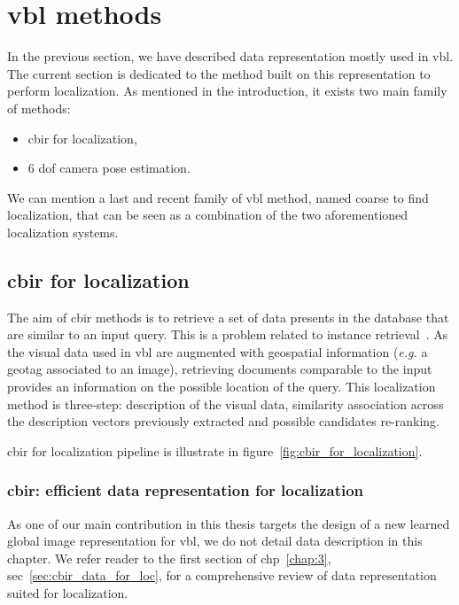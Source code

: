 \section{\acs*{vbl} methods}

In the previous section, we have described data representation mostly used in \ac{vbl}. The current section is dedicated to the method built on this representation to perform localization. As mentioned in the introduction, it exists two main family of methods:
\begin{itemize}
	\item \Acf{cbir} for localization,
	\item 6 \ac{dof} camera pose estimation.
\end{itemize}

We can mention a last and recent family of \ac{vbl} method, named coarse to find localization, that can be seen as a combination of the two aforementioned localization systems.
\label{sec:vbl_methods}
	
\subsection{\acs*{cbir} for localization}


\label{subsec:vbl_as_image_retrieval}
The aim of \ac{cbir} methods is to retrieve a set of data presents in the database that are similar to an input query. This is a problem related to instance retrieval~\citep{Zheng2017}. As the visual data used in \ac{vbl} are augmented with geospatial information (\textit{e.g.} a geotag associated to an image), retrieving documents comparable to the input provides an information on the possible location of the query. This localization method is three-step: description of the visual data, similarity association across the description vectors previously extracted and possible candidates re-ranking.

\acs*{cbir} for localization pipeline is illustrate in figure~\ref{fig:cbir_for_localization}.

\subsubsection{\acs*{cbir}: efficient data representation for localization}
As one of our main contribution in this thesis targets the design of a new learned global image representation for \ac{vbl}, we do not detail data description in this chapter. We refer reader to the first section of \acl{chp}~\ref{chap:3}, \acs{sec}~\ref{sec:cbir_data_for_loc}, for a comprehensive review of data representation suited for localization.

